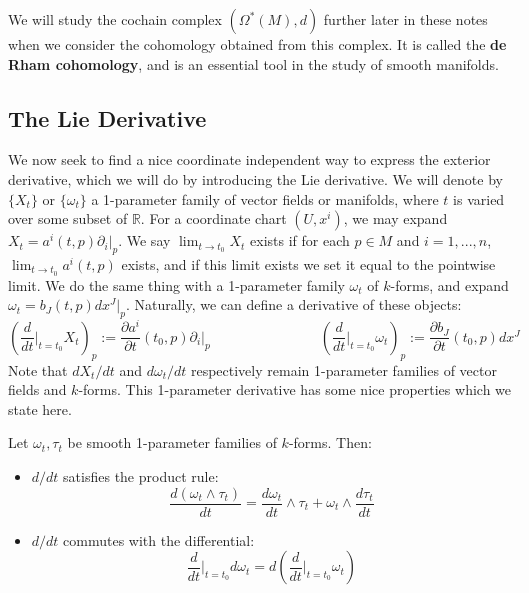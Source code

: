 We will study the cochain complex $(\Omega^*(M), d)$ further later in these notes when we consider the cohomology obtained 
from this complex. It is called the \textbf{de Rham cohomology}, and is an essential tool in the study of smooth manifolds. 

\subsection{The Lie Derivative}

We now seek to find a nice coordinate independent way to express the exterior derivative, which we will do by introducing 
the Lie derivative. We will denote by $\{X_t\}$ or $\{\omega_t\}$ a 1-parameter family of vector fields or manifolds, where 
$t$ is varied over some subset of $\mathbb R$. For a coordinate chart $(U, x^i)$, we may expand $X_t = a^i(t, p)\partial_i|_p$. 
We say $\lim_{t\rightarrow t_0}X_t$ exists if for each $p\in M$ and $i = 1, ..., n$, $\lim_{t\rightarrow t_0} a^i(t, p)$ exists, and 
if this limit exists we set it equal to the pointwise limit. We do the same thing with a 1-parameter family $\omega_t$ of 
$k$-forms, and expand $\omega_t = b_J(t, p) dx^J|_p$. Naturally, we can define a derivative of these objects:
\begin{equation}
	\left(\frac{d}{dt}\bigg|_{t = t_0} X_t\right)_p := \frac{\partial a^i}{\partial t}(t_0, p)\partial_i|_p
	\;\;\;\;\;\;\;\;\;\;\;\;\;\;\;\;\;\;\;\;\;\;\;\;\;\;\;\;
	\left(\frac{d}{dt}\bigg|_{t = t_0} \omega_t\right)_p := \frac{\partial b_J}{\partial t}(t_0, p)dx^J
\end{equation}
Note that $dX_t / dt$ and $d\omega_t / dt$ respectively remain 1-parameter families of vector fields and $k$-forms. This 
1-parameter derivative has some nice properties which we state here.
\begin{theorem}
	Let $\omega_t, \tau_t$ be smooth 1-parameter families of $k$-forms. Then:
	\begin{itemize}
		\item $d / dt$ satisfies the product rule:
		\begin{equation}
			\frac{d(\omega_t\wedge\tau_t)}{dt} = \frac{d\omega_t}{dt}\wedge\tau_t + \omega_t\wedge\frac{d\tau_t}{dt}
		\end{equation}
		\item $d / dt$ commutes with the differential:
		\begin{equation}
			\frac{d}{dt}\bigg|_{t = t_0} d\omega_t = d\left(\frac{d}{dt}\bigg|_{t = t_0}\omega_t\right)
		\end{equation}
	\end{itemize}
\end{theorem}

